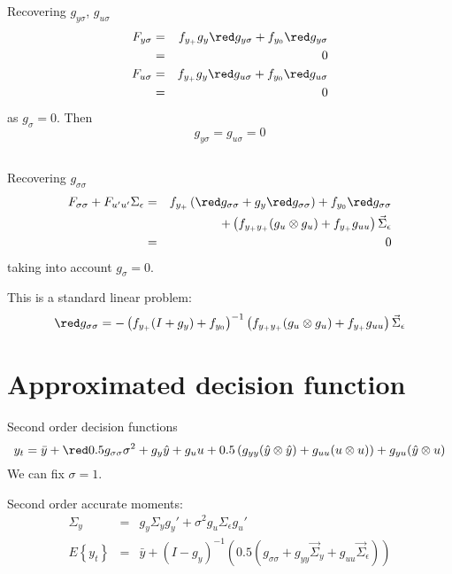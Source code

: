 \documentclass{beamer}
\begin{document}
\subsection[]{}
\begin{slide}{Recovering $g_{y\sigma}$, $g_{u\sigma}$}
  \begin{eqnarray*}
    F_{y\sigma} &=& f_{y_+}g_y{\red g_{y\sigma}}+f_{y_0}{\red g_{y\sigma}}\\
&=&0 \\
    F_{u\sigma} &=& f_{y_+}g_y{\red g_{u\sigma}}+f_{y_0}{\red g_{u\sigma}}\\
&=&0 
  \end{eqnarray*}
as $g_\sigma=0$. Then
\[
g_{y\sigma}=g_{u\sigma}=0
\]
\end{slide}

\subsection[]{}
\begin{slide}{Recovering $g_{\sigma\sigma}$}
  \begin{eqnarray*}
    F_{\sigma\sigma}+F_{u'u'}\Sigma_\epsilon &=& f_{y_+}\left({\red g_{\sigma\sigma}}+g_y{\red g_{\sigma\sigma}}\right)+f_{y_0}{\red g_{\sigma\sigma}}\\
&&+\left(f_{y_+y_+}(g_u\otimes g_u)+f_{y_+}g_{uu}\right)\vec\Sigma_\epsilon\\
&=&0 
  \end{eqnarray*}
taking into account $g_\sigma=0$.

This is a standard linear problem:
\[
{\red g_{\sigma\sigma}}=-\left(f_{y_+}(I+g_y)+f_{y_0}\right)^{-1}\left(f_{y_+y_+}(g_u\otimes g_u)+f_{y_+}g_{uu}\right)\vec\Sigma_\epsilon
\]
\end{slide}

\section[Approximated decision function]{Approximated decision function}
\begin{slide}{Second order decision functions}
{\tiny
\[
y_t = \bar y+{\red 0.5g_{\sigma\sigma}\sigma^2}+g_y\hat y+g_uu+0.5\left(g_{yy}(\hat y\otimes \hat y)+g_{uu}(u \otimes u)\right)+g_{yu}(\hat y \otimes u) 
\]
}
We can fix $\sigma=1$.
\bigskip

Second order accurate moments:
\begin{eqnarray*}
  \Sigma_y &=& g_y \Sigma_y g_y'+\sigma^2g_u\Sigma_\epsilon g_u'\\
  E\left\{y_t\right\} &=& \bar y+\left(I-g_y\right)^{-1}\left(0.5\left(g_{\sigma\sigma}+g_{yy}\vec\Sigma_y+g_{uu}\vec\Sigma_\epsilon\right)\right)
\end{eqnarray*}
\end{slide}
\end{document}
